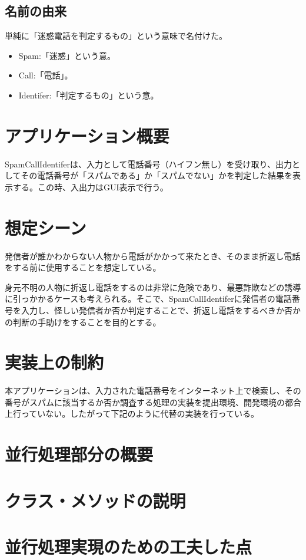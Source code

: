 \documentclass[dvipdfmx, titlepage]{jsarticle}
\begin{document}
\subsection{名前の由来}
単純に「迷惑電話を判定するもの」という意味で名付けた。
\begin{itemize}
  \item Spam:「迷惑」という意。
  \item Call:「電話」。
  \item Identifer:「判定するもの」という意。
\end{itemize}
\section{アプリケーション概要}
SpamCallIdentiferは、入力として電話番号（ハイフン無し）を受け取り、出力としてその電話番号が「スパムである」か「スパムでない」かを判定した結果を表示する。この時、入出力はGUI表示で行う。
\section{想定シーン}
発信者が誰かわからない人物から電話がかかって来たとき、そのまま折返し電話をする前に使用することを想定している。\par
身元不明の人物に折返し電話をするのは非常に危険であり、最悪詐欺などの誘導に引っかかるケースも考えられる。そこで、SpamCallIdentiferに発信者の電話番号を入力し、怪しい発信者か否か判定することで、折返し電話をするべきか否かの判断の手助けをすることを目的とする。
\section{実装上の制約}
本アプリケーションは、入力された電話番号をインターネット上で検索し、その番号がスパムに該当するか否か調査する処理の実装を提出環境、開発環境の都合上行っていない。したがって下記のように代替の実装を行っている。
\section{並行処理部分の概要}
\section{クラス・メソッドの説明}
\section{並行処理実現のための工夫した点}
\end{document}
